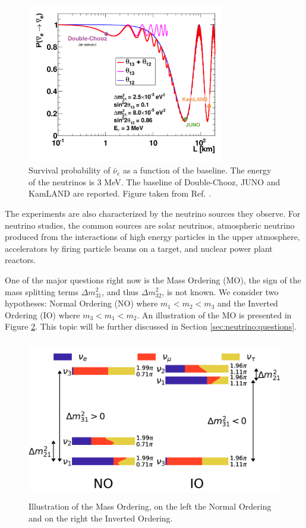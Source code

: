 \documentclass[../main.tex]{subfiles}
\begin{document}
\begin{figure}[ht]
  \centering
  \includegraphics[height=7cm]{images/neutrinos/baseline_effect.png}
  \caption{Survival probability of $\bar{\nu}_e$ as a function of the baseline. The energy of the neutrinos is 3 MeV. The baseline of Double-Chooz, JUNO and KamLAND are reported. Figure taken from Ref. \cite{lebrin_towards_2022}.}
  \label{fig:neutrino:baseline_effect}
\end{figure}

The experiments are also characterized by the neutrino sources they observe. For neutrino studies, the common sources are solar neutrinos, atmospheric neutrino produced from the interactions of high energy particles in the upper atmosphere, accelerators by firing particle beams on a target, and nuclear power plant reactors.

One of the major questions right now is the Mass Ordering (MO), the sign of the mass splitting terms $\Delta m^2_{31}$, and thus $\Delta m^2_{32}$, is not known. We consider two hypotheses: Normal Ordering (NO) where $m_1 < m_2 < m_3$ and the Inverted Ordering (IO) where $m_3 < m_1 < m_2$. An illustration of the MO is presented in Figure \ref{fig:neutrino:nmo}. This topic will be further discussed in Section \ref{sec:neutrino:questions}.

\begin{figure}
  \centering
  \includegraphics[height=7cm]{images/neutrinos/nmo.png}
  \caption{Illustration of the Mass Ordering, on the left the Normal Ordering and on the right the Inverted Ordering.}
  \label{fig:neutrino:nmo}
\end{figure}
\end{document}
